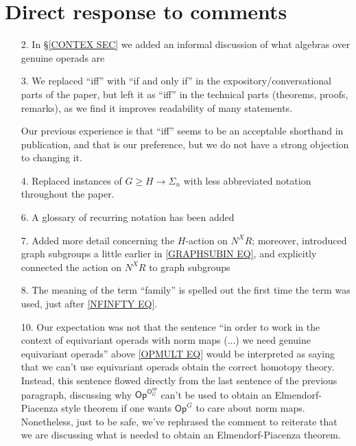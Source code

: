 \documentclass{article}
\begin{document}
\section{Direct response to comments}

\begin{itemize}
	\item[2.] In \S \ref{CONTEX SEC} we added an informal discussion of what algebras over genuine operads are
	
	\item[3.] We replaced ``iff'' with ``if and only if''
	in the expository/conversational parts of the paper, 
	but left it as ``iff'' in the technical parts (theorems, proofs, remarks), as we find it improves readability of many statements.
	
	Our previous experience is that ``iff'' seems to be an acceptable shorthand in publication, and that is our preference,
	but we do not have a strong objection to changing it.


        \item[4.] Replaced instances of $G \geq H \to \Sigma_n$ with less abbreviated notation throughout the paper.
        
	\item[6.] 
		A glossary of recurring notation has been added
      
	\item[7.] Added more detail concerning the 
	$H$-action on $N^X R$;
	moreover, introduced graph subgroups a little earlier in
	\eqref{GRAPHSUBIN EQ},
	and explicitly connected the action on 
	$N^X R$ to graph subgroups
	
	\item[8.] The meaning of the term ``family''
              is
              spelled out the first time the term was used, just after \eqref{NFINFTY EQ}.

	\item[10.]
              Our expectation was not that the sentence
              ``in order to work in the context of equivariant operads with norm maps (...) we need genuine equivariant operads''
              above \eqref{OPMULT EQ}
              would be interpreted as saying that we can't use equivariant operads obtain the correct homotopy theory.
              Instead, this sentence flowed directly from the last sentence of the previous paragraph, discussing why
	$\mathsf{Op}^{\mathsf{O}_G^{op}}$
	can't be used to obtain an Elmendorf-Piacenza style theorem if one wants $\mathsf{Op}^G$ to care about norm maps.
	Nonetheless, just to be safe, we've rephrased the comment to reiterate that we are discussing what is needed to obtain
	an Elmendorf-Piacenza theorem.
	

\end{itemize}
\end{document}
